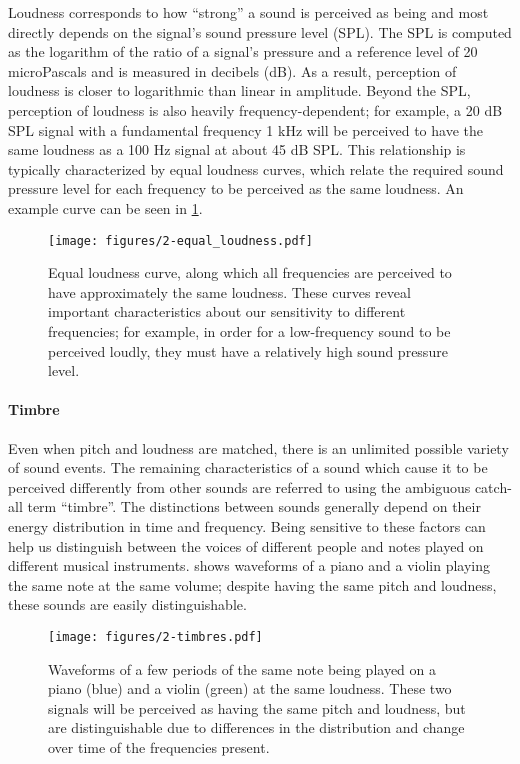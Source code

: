 Loudness corresponds to how ``strong'' a sound is perceived as being and most directly depends on the signal's sound pressure level (SPL).
The SPL is computed as the logarithm of the ratio of a signal's pressure and a reference level of 20 microPascals and is measured in decibels (dB).
As a result, perception of loudness is closer to logarithmic than linear in amplitude.
Beyond the SPL, perception of loudness is also heavily frequency-dependent; for example, a 20 dB SPL signal with a fundamental frequency 1 kHz will be perceived to have the same loudness as a 100 Hz signal at about 45 dB SPL.
This relationship is typically characterized by equal loudness curves, which relate the required sound pressure level for each frequency to be perceived as the same loudness.
An example curve can be seen in \cref{fig:equal_loudness}.

\begin{figure}
  \centering
  \texttt{[image: figures/2-equal\_loudness.pdf]}
  \caption[Equal loudness curve]{Equal loudness curve, along which all frequencies are perceived to have approximately the same loudness.
  These curves reveal important characteristics about our sensitivity to different frequencies; for example, in order for a low-frequency sound to be perceived loudly, they must have a relatively high sound pressure level.}
  \label{fig:equal_loudness}
\end{figure}

\paragraph{Timbre}

Even when pitch and loudness are matched, there is an unlimited possible variety of sound events.
The remaining characteristics of a sound which cause it to be perceived differently from other sounds are referred to using the ambiguous catch-all term ``timbre''.
The distinctions between sounds generally depend on their energy distribution in time and frequency.
Being sensitive to these factors can help us distinguish between the voices of different people and notes played on different musical instruments.
 shows waveforms of a piano and a violin playing the same note at the same volume; despite having the same pitch and loudness, these sounds are easily distinguishable.

\begin{figure}
  \centering
  \texttt{[image: figures/2-timbres.pdf]}
  \caption[Waveforms of piano and violin]{Waveforms of a few periods of the same note being played on a piano (blue) and a violin (green) at the same loudness.
  These two signals will be perceived as having the same pitch and loudness, but are distinguishable due to differences in the distribution and change over time of the frequencies present.}
  \label{fig:timbres}
\end{figure}

